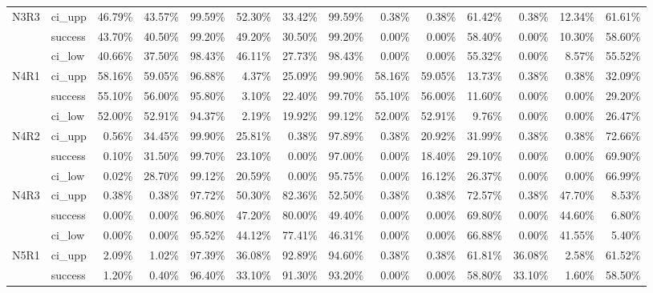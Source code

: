 \begin{tabular}{llrrrrrrrrrrrr}
N3R3 & ci\_upp &      46.79\% & 43.57\% & 99.59\% & 52.30\% & 33.42\% & 99.59\% &        0.38\% &  0.38\% & 61.42\% &  0.38\% & 12.34\% & 61.61\% \\
     & success &      43.70\% & 40.50\% & 99.20\% & 49.20\% & 30.50\% & 99.20\% &        0.00\% &  0.00\% & 58.40\% &  0.00\% & 10.30\% & 58.60\% \\
     & ci\_low &      40.66\% & 37.50\% & 98.43\% & 46.11\% & 27.73\% & 98.43\% &        0.00\% &  0.00\% & 55.32\% &  0.00\% &  8.57\% & 55.52\% \\
N4R1 & ci\_upp &      58.16\% & 59.05\% & 96.88\% &  4.37\% & 25.09\% & 99.90\% &       58.16\% & 59.05\% & 13.73\% &  0.38\% &  0.38\% & 32.09\% \\
     & success &      55.10\% & 56.00\% & 95.80\% &  3.10\% & 22.40\% & 99.70\% &       55.10\% & 56.00\% & 11.60\% &  0.00\% &  0.00\% & 29.20\% \\
     & ci\_low &      52.00\% & 52.91\% & 94.37\% &  2.19\% & 19.92\% & 99.12\% &       52.00\% & 52.91\% &  9.76\% &  0.00\% &  0.00\% & 26.47\% \\
N4R2 & ci\_upp &       0.56\% & 34.45\% & 99.90\% & 25.81\% &  0.38\% & 97.89\% &        0.38\% & 20.92\% & 31.99\% &  0.38\% &  0.38\% & 72.66\% \\
     & success &       0.10\% & 31.50\% & 99.70\% & 23.10\% &  0.00\% & 97.00\% &        0.00\% & 18.40\% & 29.10\% &  0.00\% &  0.00\% & 69.90\% \\
     & ci\_low &       0.02\% & 28.70\% & 99.12\% & 20.59\% &  0.00\% & 95.75\% &        0.00\% & 16.12\% & 26.37\% &  0.00\% &  0.00\% & 66.99\% \\
N4R3 & ci\_upp &       0.38\% &  0.38\% & 97.72\% & 50.30\% & 82.36\% & 52.50\% &        0.38\% &  0.38\% & 72.57\% &  0.38\% & 47.70\% &  8.53\% \\
     & success &       0.00\% &  0.00\% & 96.80\% & 47.20\% & 80.00\% & 49.40\% &        0.00\% &  0.00\% & 69.80\% &  0.00\% & 44.60\% &  6.80\% \\
     & ci\_low &       0.00\% &  0.00\% & 95.52\% & 44.12\% & 77.41\% & 46.31\% &        0.00\% &  0.00\% & 66.88\% &  0.00\% & 41.55\% &  5.40\% \\
N5R1 & ci\_upp &       2.09\% &  1.02\% & 97.39\% & 36.08\% & 92.89\% & 94.60\% &        0.38\% &  0.38\% & 61.81\% & 36.08\% &  2.58\% & 61.52\% \\
     & success &       1.20\% &  0.40\% & 96.40\% & 33.10\% & 91.30\% & 93.20\% &        0.00\% &  0.00\% & 58.80\% & 33.10\% &  1.60\% & 58.50\% \\

\end{tabular}
